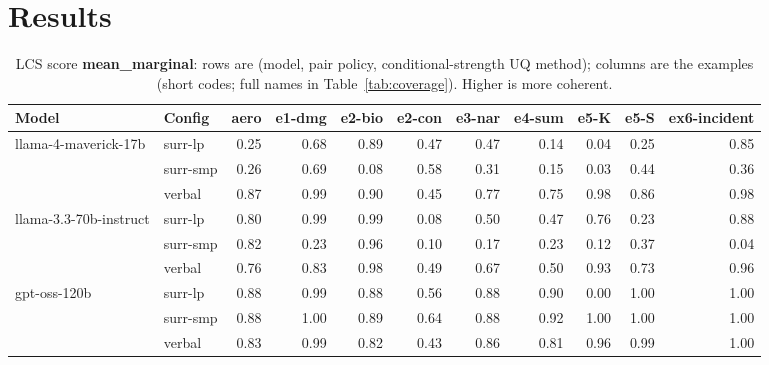 \documentclass[11pt]{article}
\begin{document}
\section{Results}

\begin{table}[htbp]
\centering
\footnotesize
\setlength{\tabcolsep}{3.5pt}
\caption{LCS score \textbf{mean\_marginal}: rows are (model, pair policy, conditional-strength UQ method); columns are the examples (short codes; full names in Table~\ref{tab:coverage}). Higher is more coherent.}
\label{tab:mean-marginal}
\begin{tabular}{llrrrrrrrrr}
\toprule
\textbf{Model} & \textbf{Config} & \textbf{aero} & \textbf{e1-dmg} & \textbf{e2-bio} & \textbf{e2-con} & \textbf{e3-nar} & \textbf{e4-sum} & \textbf{e5-K} & \textbf{e5-S} & \textbf{ex6-incident} \\
\midrule
llama-4-maverick-17b & surr-lp & 0.25 & 0.68 & 0.89 & 0.47 & 0.47 & 0.14 & 0.04 & 0.25 & 0.85 \\
 & surr-smp & 0.26 & 0.69 & 0.08 & 0.58 & 0.31 & 0.15 & 0.03 & 0.44 & 0.36 \\
 & verbal & 0.87 & 0.99 & 0.90 & 0.45 & 0.77 & 0.75 & 0.98 & 0.86 & 0.98 \\
\midrule
llama-3.3-70b-instruct & surr-lp & 0.80 & 0.99 & 0.99 & 0.08 & 0.50 & 0.47 & 0.76 & 0.23 & 0.88 \\
 & surr-smp & 0.82 & 0.23 & 0.96 & 0.10 & 0.17 & 0.23 & 0.12 & 0.37 & 0.04 \\
 & verbal & 0.76 & 0.83 & 0.98 & 0.49 & 0.67 & 0.50 & 0.93 & 0.73 & 0.96 \\
\midrule
gpt-oss-120b & surr-lp & 0.88 & 0.99 & 0.88 & 0.56 & 0.88 & 0.90 & 0.00 & 1.00 & 1.00 \\
 & surr-smp & 0.88 & 1.00 & 0.89 & 0.64 & 0.88 & 0.92 & 1.00 & 1.00 & 1.00 \\
 & verbal & 0.83 & 0.99 & 0.82 & 0.43 & 0.86 & 0.81 & 0.96 & 0.99 & 1.00 \\
\bottomrule
\end{tabular}
\end{table}
\end{document}
